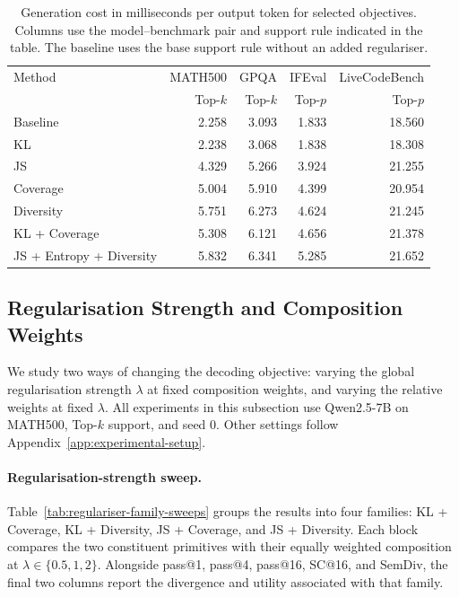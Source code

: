 \documentclass{article} %
\begin{document}
\begin{table}[!htbp]
\centering
\small
\setlength{\tabcolsep}{5pt}
\renewcommand{\arraystretch}{1.08}
\begin{tabular}{lrrrr}
\toprule
Method & MATH500 & GPQA & IFEval & LiveCodeBench \\
& Top-$k$ & Top-$k$ & Top-$p$ & Top-$p$ \\
\midrule
Baseline
& 2.258 & 3.093 & 1.833 & 18.560 \\
KL
& 2.238 & 3.068 & 1.838 & 18.308 \\
JS
& 4.329 & 5.266 & 3.924 & 21.255 \\
Coverage
& 5.004 & 5.910 & 4.399 & 20.954 \\
Diversity
& 5.751 & 6.273 & 4.624 & 21.245 \\
\midrule
KL + Coverage
& 5.308 & 6.121 & 4.656 & 21.378 \\
JS + Entropy + Diversity
& 5.832 & 6.341 & 5.285 & 21.652 \\
\bottomrule
\end{tabular}
\caption{Generation cost in milliseconds per output
token for selected objectives. Columns use the model--benchmark
pair and support rule indicated in the table. The baseline uses
the base support rule without an added regulariser.}
\label{tab:compact-generation-cost}
\end{table}

\FloatBarrier

\subsection{Regularisation Strength and Composition Weights}
\label{app:coefficient-sweeps}

We study two ways of changing the decoding objective: varying the global regularisation strength $\lambda$ at fixed composition weights, and varying the relative weights at fixed $\lambda$. All experiments in this subsection use Qwen2.5-7B on MATH500, Top-$k$ support, and seed $0$. Other settings follow Appendix~\ref{app:experimental-setup}.

\paragraph{Regularisation-strength sweep.}
Table~\ref{tab:regulariser-family-sweeps} groups the results into four families: KL + Coverage, KL + Diversity, JS + Coverage, and JS + Diversity. Each block compares the two constituent primitives with their equally weighted composition at $\lambda\in\{0.5,1,2\}$. Alongside pass@1, pass@4, pass@16, SC@16, and SemDiv, the final two columns report the divergence and utility associated with that family.
\end{document}
